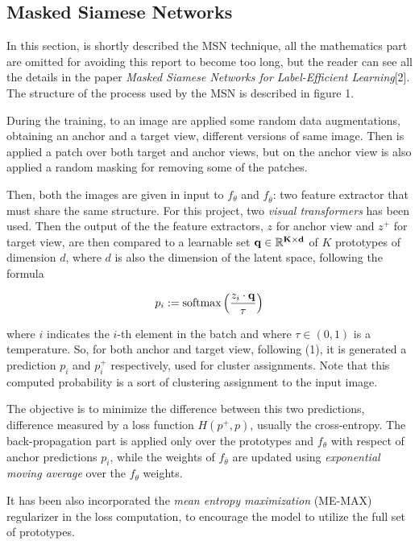 \documentclass[column]{article}
\begin{document}
\begin{multicols}{2}
	
	\section{Masked Siamese Networks}
	In this section, is shortly described the MSN technique, all the mathematics part are omitted for avoiding this report to become too long, but the reader can see all the details in the paper \textit{Masked Siamese Networks for Label-Efficient Learning}[2]. The structure of the process used by the MSN is described in figure 1. 
	
	During the training, to an image are applied some random data augmentations, obtaining an anchor and a target view, different versions of same image. Then is applied a patch over both target and anchor views, but on the anchor view is also applied a random masking for removing some of the patches. 
	
	Then, both the images are given in input to $f_\theta$ and $f_{\overline{\theta}}$: two feature extractor that must share the same structure. For this project, two \textit{visual transformers} has been used. Then the output of the the feature extractors, $z$ for anchor view and $z^+$ for target view, are then compared to a learnable set $\bf q \in \mathbb{R}^{K \times d}$ of $K$ prototypes of dimension $d$, where $d$ is also the dimension of the latent space, following the formula
	
	\begin{equation}
		p_{i} := \textnormal{softmax}\left(\frac{z_i \cdot \bf q}{\tau}\right)
	\end{equation}
	
	where $i$ indicates the $i$-th element in the batch and where $\tau\in(0,1)$ is a temperature. So, for both anchor and target view, following (1), it is generated a prediction $p_i$ and $p_i^+$ respectively, used for cluster assignments. Note that this computed probability is a sort of clustering assignment to the input image.
	
	The objective is to minimize the difference between this two predictions, difference measured by a loss function $H(p^+, p)$, usually the cross-entropy. The back-propagation part is applied only over the prototypes and $f_\theta$ with respect of anchor predictions $p_i$, while the weights of $f_{\overline{\theta}}$ are updated using \textit{exponential moving average} over the $f_\theta$ weights. 
	
	It has been also incorporated the \textit{mean entropy maximization} (ME-MAX) regularizer in the loss computation,  to encourage the model to utilize the full set of prototypes.
	
	\end{multicols}
	
\end{document}
